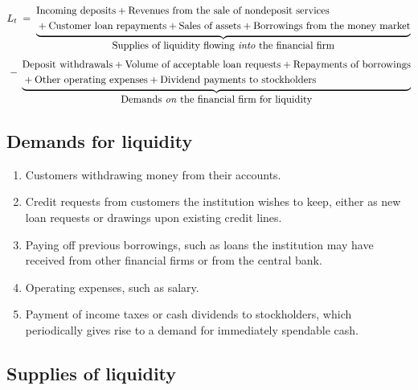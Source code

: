 \begin{lrfmlbox}
\[
L_t \;=\;
\underbrace{\!\begin{aligned}
&\text{Incoming deposits} + \text{Revenues from the sale of nondeposit services}\\
&+ \text{Customer loan repayments} + \text{Sales of assets} + \text{Borrowings from the money market}
\end{aligned}}_{\textstyle\text{Supplies of liquidity flowing \emph{into} the financial firm}}
\]
\vspace{-6pt}
\[
\;-\;
\underbrace{\!\begin{aligned}
&\text{Deposit withdrawals} + \text{Volume of acceptable loan requests} + \text{Repayments of borrowings}\\
&+ \text{Other operating expenses} + \text{Dividend payments to stockholders}
\end{aligned}}_{\textstyle\text{Demands \emph{on} the financial firm for liquidity}}
\]
\end{lrfmlbox}

\subsection{Demands for liquidity}

\begin{enumerate}
\item Customers withdrawing money from their accounts.
\item Credit requests from customers the institution wishes to keep, either as new loan requests or drawings upon existing credit lines.
\item Paying off previous borrowings, such as loans the institution may have received from other financial firms or from the central bank.
\item Operating expenses, such as salary.
\item Payment of income taxes or cash dividends to stockholders, which periodically gives rise to a demand for immediately spendable cash.
\end{enumerate}

\subsection{Supplies of liquidity}

